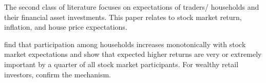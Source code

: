 \documentclass[ProjectABM]{subfiles}
\begin{document}




The second class of literature focuses on expectations of traders/ households and their financial asset investments. This paper relates to stock market return, inflation, and house price expectations.

\cite{arrondel_et_al_2014subjective_return_expectation} find that participation among households increases monotonically with stock market expectations and \cite{choi_2020} show that expected higher returns are very or extremely important by a quarter of all stock market participants. For wealthy retail investors, \cite{giglio_et_al_2019five} confirm the mechanism.
\end{document}
